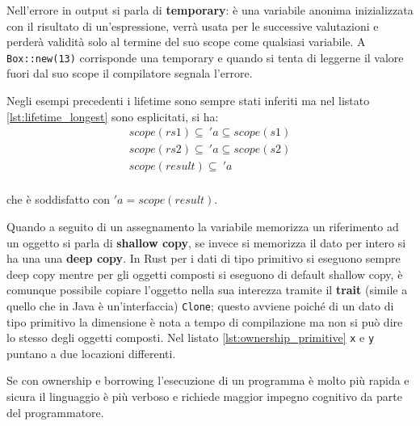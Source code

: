 \documentclass[Lau,binding=0.6cm]{sapthesis}
\newcommand{\textcode}[1]{\colorbox{backcolour}{\texttt{#1}}}
\begin{document}



Nell'errore in output si parla di \textbf{temporary}: è una variabile anonima inizializzata con il risultato di un'espressione, verrà usata per le successive valutazioni e perderà validità solo al termine del suo scope come qualsiasi variabile. 
A \textcode{Box::new(13)} corrisponde una temporary e quando si tenta di leggerne il valore fuori dal suo scope il compilatore segnala l'errore. 

Negli esempi precedenti i lifetime sono sempre stati inferiti ma nel listato \ref{lst:lifetime_longest} sono esplicitati, si ha:
\begin{gather*}
    scope(rs1) \subseteq \ 'a \subseteq scope(s1) \\
    scope(rs2) \subseteq \ 'a \subseteq scope(s2) \\
    scope(result) \subseteq \ 'a \\
\end{gather*}

che è soddisfatto con $ 'a = scope(result) $.




Quando a seguito di un assegnamento la variabile memorizza un riferimento ad un oggetto si parla di \textbf{shallow copy}, se invece si memorizza il dato per intero si ha una una \textbf{deep copy}. 
In Rust per i dati di tipo primitivo si eseguono sempre deep copy mentre per gli oggetti composti si eseguono di default shallow copy, è comunque possibile copiare l'oggetto nella sua interezza tramite il \textbf{trait} (simile a quello che in Java è un'interfaccia) \textcode{Clone}; questo avviene poiché di un dato di tipo primitivo la dimensione è nota a tempo di compilazione ma non si può dire lo stesso degli oggetti composti. Nel listato \ref{lst:ownership_primitive} \textcode{x} e \textcode{y} puntano a due locazioni differenti.



Se con ownership e borrowing l'esecuzione di un programma è molto più rapida e sicura il linguaggio è più verboso e richiede maggior impegno cognitivo da parte del programmatore. 
\end{document}
